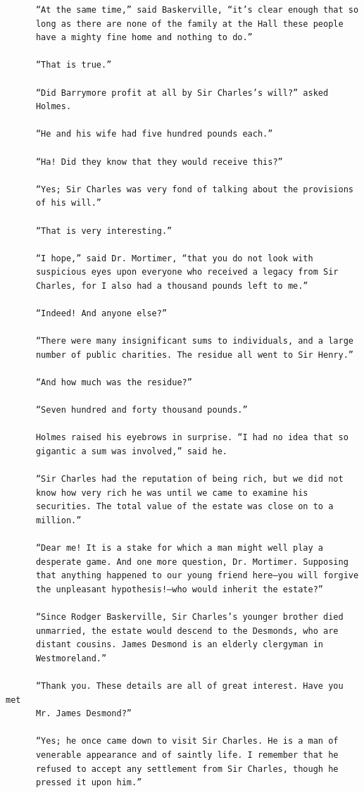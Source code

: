 \documentclass{article}
\begin{document}
\begin{verbatim}
      “At the same time,” said Baskerville, “it’s clear enough that so
      long as there are none of the family at the Hall these people
      have a mighty fine home and nothing to do.”

      “That is true.”

      “Did Barrymore profit at all by Sir Charles’s will?” asked
      Holmes.

      “He and his wife had five hundred pounds each.”

      “Ha! Did they know that they would receive this?”

      “Yes; Sir Charles was very fond of talking about the provisions
      of his will.”

      “That is very interesting.”

      “I hope,” said Dr. Mortimer, “that you do not look with
      suspicious eyes upon everyone who received a legacy from Sir
      Charles, for I also had a thousand pounds left to me.”

      “Indeed! And anyone else?”

      “There were many insignificant sums to individuals, and a large
      number of public charities. The residue all went to Sir Henry.”

      “And how much was the residue?”

      “Seven hundred and forty thousand pounds.”

      Holmes raised his eyebrows in surprise. “I had no idea that so
      gigantic a sum was involved,” said he.

      “Sir Charles had the reputation of being rich, but we did not
      know how very rich he was until we came to examine his
      securities. The total value of the estate was close on to a
      million.”

      “Dear me! It is a stake for which a man might well play a
      desperate game. And one more question, Dr. Mortimer. Supposing
      that anything happened to our young friend here—you will forgive
      the unpleasant hypothesis!—who would inherit the estate?”

      “Since Rodger Baskerville, Sir Charles’s younger brother died
      unmarried, the estate would descend to the Desmonds, who are
      distant cousins. James Desmond is an elderly clergyman in
      Westmoreland.”

      “Thank you. These details are all of great interest. Have you met
      Mr. James Desmond?”

      “Yes; he once came down to visit Sir Charles. He is a man of
      venerable appearance and of saintly life. I remember that he
      refused to accept any settlement from Sir Charles, though he
      pressed it upon him.”


\end{verbatim}
\end{document}
